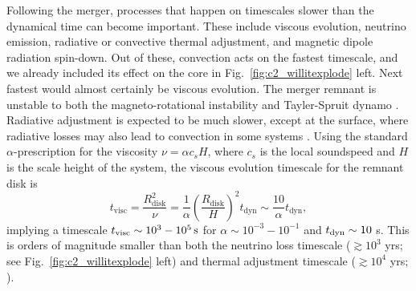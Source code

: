 Following the merger, processes that happen on timescales slower than the dynamical time can become important.  These include viscous evolution, neutrino emission, radiative or convective thermal adjustment, and magnetic dipole radiation spin-down.  Out of these, convection acts on the fastest timescale, and we already included its effect on the core in Fig.~\ref{fig:c2_willitexplode} left.  Next fastest would almost certainly be viscous evolution.  The merger remnant is unstable to both the magneto-rotational instability \citep{balbh91} and Tayler-Spruit dynamo \citep{spru02}.  Radiative adjustment is expected to be much slower, except at the surface, where radiative losses may also lead to convection in some systems \citep{shen+12,schw+12,rask+12}.  Using the standard \cite{shaks73} $\alpha$-prescription for the viscosity $\nu = \alpha c_s H$, where $c_s$ is the local soundspeed and $H$ is the scale height of the system, the viscous evolution timescale for the remnant disk is
\begin{equation}
t_\mathrm{visc} = \frac{R_\mathrm{disk}^2}{\nu} = \frac{1}{\alpha}\left(\frac{R_\mathrm{disk}}{H}\right)^2t_\mathrm{dyn} \sim \frac{10}{\alpha}t_\mathrm{dyn},
\end{equation}
implying a timescale $t_{\rm visc}\sim10^3-10^5{\rm\,s}$ for $\alpha\sim10^{-3}-10^{-1}$ and $t_\mathrm{dyn} \sim 10$ s.  This is orders of magnitude smaller than both the neutrino loss timescale ($\gtrsim\!10^3$ yrs; see Fig.~\ref{fig:c2_willitexplode} left) and thermal adjustment timescale ($\gtrsim\!10^4$ yrs; \citealt{shen+12}).


